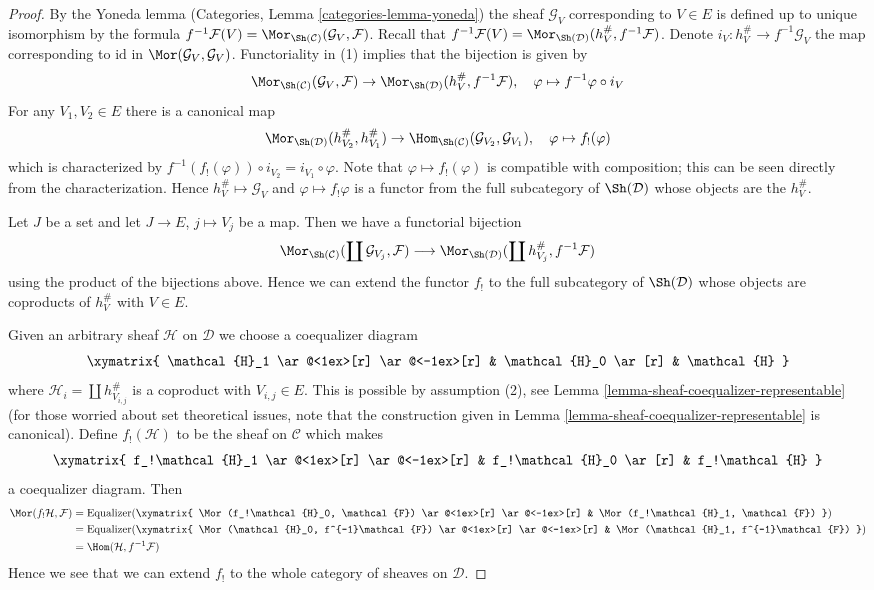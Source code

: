 \begin{proof}
By the Yoneda lemma (Categories, Lemma \ref{categories-lemma-yoneda})
the sheaf $\mathcal{G}_V$ corresponding to $V \in E$
is defined up to unique isomorphism by the formula
$f^{-1}\mathcal{F}(V) = \Mor_{\Sh(\mathcal{C})}(\mathcal{G}_V, \mathcal{F})$.
Recall that
$f^{-1}\mathcal{F}(V) = \Mor_{\Sh(\mathcal{D})}(h_V^\#, f^{-1}\mathcal{F})$.
Denote $i_V : h_V^\# \to f^{-1}\mathcal{G}_V$ the map corresponding to
$\text{id}$ in $\Mor(\mathcal{G}_V, \mathcal{G}_V)$.
Functoriality in (1) implies that the bijection is given by
$$
\Mor_{\Sh(\mathcal{C})}(\mathcal{G}_V, \mathcal{F}) \to
\Mor_{\Sh(\mathcal{D})}(h_V^\#, f^{-1}\mathcal{F}),\quad
\varphi \mapsto f^{-1}\varphi \circ i_V
$$
For any $V_1, V_2 \in E$ there is a canonical map
$$
\Mor_{\Sh(\mathcal{D})}(h^\#_{V_2}, h^\#_{V_1})
\to
\Hom_{\Sh(\mathcal{C})}(\mathcal{G}_{V_2}, \mathcal{G}_{V_1}),\quad
\varphi \mapsto f_!(\varphi)
$$
which is characterized by
$f^{-1}(f_!(\varphi)) \circ i_{V_2} = i_{V_1} \circ \varphi$.
Note that $\varphi \mapsto f_!(\varphi)$ is
compatible with composition; this can be seen directly
from the characterization. Hence $h_V^\# \mapsto \mathcal{G}_V$
and $\varphi \mapsto f_!\varphi$ is a functor from
the full subcategory of $\Sh(\mathcal{D})$ whose objects are the $h_V^\#$.

\medskip\noindent
Let $J$ be a set and let $J \to E$, $j \mapsto V_j$ be a map.
Then we have a functorial bijection
$$
\Mor_{\Sh(\mathcal{C})}(\coprod \mathcal{G}_{V_j}, \mathcal{F})
\longrightarrow
\Mor_{\Sh(\mathcal{D})}(\coprod h_{V_j}^\#, f^{-1}\mathcal{F})
$$
using the product of the bijections above. Hence we can extend the
functor $f_!$ to the full subcategory of $\Sh(\mathcal{D})$ whose
objects are coproducts of $h_V^\#$ with $V \in E$.

\medskip\noindent
Given an arbitrary sheaf $\mathcal{H}$ on $\mathcal{D}$ we choose a
coequalizer diagram
$$
\xymatrix{
\mathcal{H}_1 \ar@<1ex>[r] \ar@<-1ex>[r] &
\mathcal{H}_0 \ar[r] &
\mathcal{H}
}
$$
where $\mathcal{H}_i = \coprod h_{V_{i, j}}^\#$
is a coproduct with $V_{i, j} \in E$.
This is possible by assumption (2), see
Lemma \ref{lemma-sheaf-coequalizer-representable}
(for those worried about set theoretical issues, note that
the construction given in
Lemma \ref{lemma-sheaf-coequalizer-representable} is canonical).
Define $f_!(\mathcal{H})$ to be the sheaf on $\mathcal{C}$
which makes
$$
\xymatrix{
f_!\mathcal{H}_1 \ar@<1ex>[r] \ar@<-1ex>[r] &
f_!\mathcal{H}_0 \ar[r] &
f_!\mathcal{H}
}
$$
a coequalizer diagram. Then
\begin{align*}
\Mor(f_!\mathcal{H}, \mathcal{F})
& =
\text{Equalizer}(
\xymatrix{
\Mor(f_!\mathcal{H}_0, \mathcal{F}) \ar@<1ex>[r] \ar@<-1ex>[r] &
\Mor(f_!\mathcal{H}_1, \mathcal{F})
}
) \\
& =
\text{Equalizer}(
\xymatrix{
\Mor(\mathcal{H}_0, f^{-1}\mathcal{F}) \ar@<1ex>[r] \ar@<-1ex>[r] &
\Mor(\mathcal{H}_1, f^{-1}\mathcal{F})
}
) \\
& =
\Hom(\mathcal{H}, f^{-1}\mathcal{F})
\end{align*}
Hence we see that we can extend $f_!$ to the whole category of sheaves
on $\mathcal{D}$.
\end{proof}

